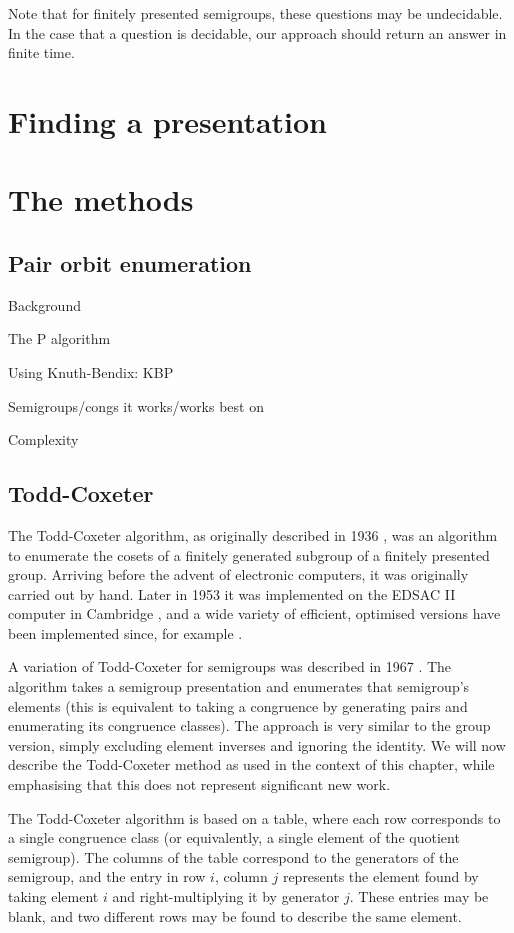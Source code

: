 Note that for finitely presented semigroups, these questions may be
undecidable.  In the case that a question is decidable, our approach should
return an answer in finite time.

\section{Finding a presentation}

\section{The methods}

\subsection{Pair orbit enumeration}
\label{sec:p}

Background

The P algorithm

Using Knuth-Bendix: KBP

Semigroups/congs it works/works best on

Complexity

\subsection{Todd-Coxeter}
\label{sec:tc}

The Todd-Coxeter algorithm, as originally described in 1936
\cite{todd_coxeter_1936}, was an algorithm to enumerate the cosets of a finitely
generated subgroup of a finitely presented group.  Arriving before the advent of
electronic computers, it was originally carried out by hand.  Later in 1953 it
was implemented on the EDSAC II computer in Cambridge \cite{leech_1963}, and a
wide variety of efficient, optimised versions have been implemented since, for
example \cite{ace}.

A variation of Todd-Coxeter for semigroups was described in 1967
\cite{neumann_1967}.  The algorithm takes a semigroup presentation and
enumerates that semigroup's elements (this is equivalent to taking a congruence
by generating pairs and enumerating its congruence classes).  The approach is
very similar to the group version, simply excluding element inverses and
ignoring the identity.  We will now describe the Todd-Coxeter method as used in
the context of this chapter, while emphasising that this does not represent
significant new work.

The Todd-Coxeter algorithm is based on a table, where each row corresponds to a
single congruence class (or equivalently, a single element of the quotient
semigroup).  The columns of the table correspond to the generators of the
semigroup, and the entry in row $i$, column $j$ represents the element found by
taking element $i$ and right-multiplying it by generator $j$.  These entries may
be blank, and two different rows may be found to describe the same element.

